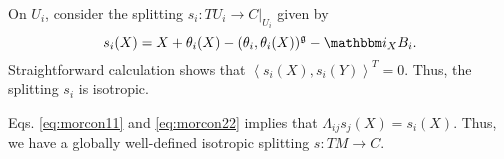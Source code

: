 \documentclass[letterpaper,10pt, oneside]{article} %
\newcommand{\calc}[1]{} %
\newcommand{\ii}{\mathbbm i}
\newcommand{\half}{\frac{1}{2}}
\newcommand{\pair}[1]{\left\langle #1\right\rangle}
\begin{document}
On $U_i$, consider the splitting $s_i:TU_i\longrightarrow C|_{U_i}$ given by
\begin{equation}\label{eq:tcs1}
s_i(X)=X+\theta_i(X)-(\theta_i,\theta_i(X))^\g-\ii_XB_i.
\end{equation}
Straightforward calculation shows that $\pair{s_i(X),s_i(Y)}^T=0$. Thus, the splitting $s_i$ is isotropic.
\calc{
\begin{eqnarray*}
  \pair{s_i(X),s_i(Y)}^T&=& \pair{X+\theta_i(X)-(\theta_i,\theta_i(X))^\g-\ii_XB_i,Y+\theta_i(Y)-(\theta_i,\theta_i(Y))^\g-\ii_YB_i}^T\\
  &=&\half\Big(-(\theta_i(Y),\theta_i(X))^\g-B_i(X,Y)-(\theta_i(X),\theta_i(Y))^\g-B_i(Y,X)\Big)+(\theta_i(X),\theta_i(Y))^\g\\
  &=&0.
\end{eqnarray*}}
Eqs. \eqref{eq:morcon11} and \eqref{eq:morcon22} implies that $\Lambda_{ij}s_j(X)=s_i(X)$. Thus, we have a globally well-defined isotropic splitting
$s:TM\longrightarrow C$.
\calc{\begin{eqnarray*}
 \Lambda_{ij}s_j(X)&=&\left(\begin{array}{ccc}
1&0&0\\
\phi_{ij}&\tau_{ij}&0\\
\beta_{ij}&-2\phi_{ij}^\star\tau_{ij}&1
\end{array}\right)\left(\begin{array}{c}
X\\
\theta_j(X)\\
-(\theta_j,\theta_j(X))^\g-\ii_XB_j
\end{array}\right)\\
&=&\left(\begin{array}{c}
X\\
\phi_{ij}(X)+\tau_{ij}\theta_j(X)\\
\beta_{ij}(X)-2\phi_{ij}^\star\tau_{ij}\theta_j(X))^\g-(\theta_j,\theta_j(X))^\g-\ii_XB_j
\end{array}\right)\\
&=&\left(\begin{array}{c}
X\\
\theta_i(X)\\
-(\theta_i,\theta_i(X))^\g-\ii_XB_i
\end{array}\right)\\
&=&s_i(X).
\end{eqnarray*}}
\end{document}
